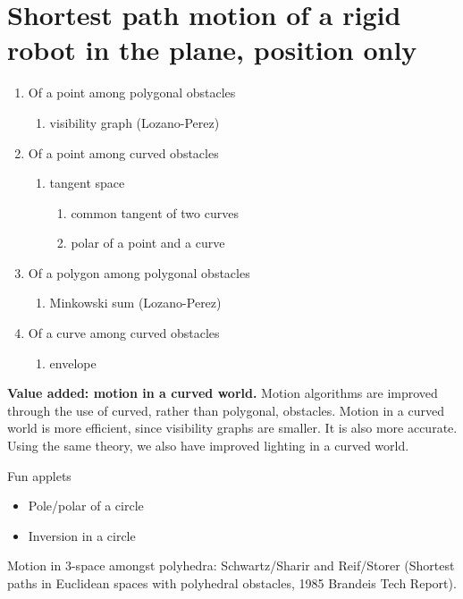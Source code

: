 \documentclass[11pt,titlepage]{article}
\begin{document}
\clearpage

\section{Shortest path motion of a rigid robot in the plane, position only}

\begin{enumerate}
\item Of a point among polygonal obstacles
\begin{enumerate}
\item visibility graph (Lozano-Perez)
\end{enumerate}
\item Of a point among curved obstacles
\begin{enumerate}
\item tangent space
\begin{enumerate}
\item common tangent of two curves
\item polar of a point and a curve
\end{enumerate}
\end{enumerate}
\item Of a polygon among polygonal obstacles
\begin{enumerate}
\item Minkowski sum (Lozano-Perez)
\end{enumerate}
\item Of a curve among curved obstacles
\begin{enumerate}
\item envelope
\end{enumerate}
\end{enumerate}

{\bf Value added: motion in a curved world.}
Motion algorithms are improved through the use of curved, rather than polygonal, obstacles.
Motion in a curved world is more efficient, since visibility graphs are smaller.
It is also more accurate.
Using the same theory, we also have improved lighting in a curved world.

\vspace{1in}
Fun applets
\begin{itemize}
\item	Pole/polar of a circle
\item   Inversion in a circle
\end{itemize}

Motion in 3-space amongst polyhedra: Schwartz/Sharir and Reif/Storer
(Shortest paths in Euclidean spaces with polyhedral obstacles, 1985 Brandeis
Tech Report).
\end{document}
